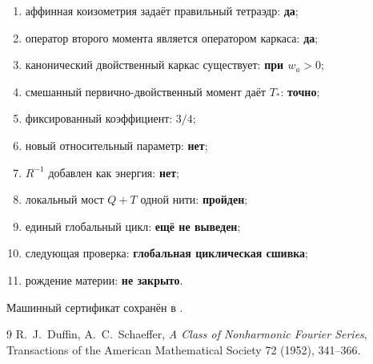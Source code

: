 \begin{protocol}
\begin{enumerate}
 \item аффинная коизометрия задаёт правильный тетраэдр: \textbf{да};
 \item оператор второго момента является оператором каркаса: \textbf{да};
 \item канонический двойственный каркас существует: \textbf{при $w_a>0$};
 \item смешанный первично-двойственный момент даёт $T_*$: \textbf{точно};
 \item фиксированный коэффициент: \textbf{$3/4$};
 \item новый относительный параметр: \textbf{нет};
 \item $R^{-1}$ добавлен как энергия: \textbf{нет};
 \item локальный мост $Q+T$ одной нити: \textbf{пройден};
 \item единый глобальный цикл: \textbf{ещё не выведен};
 \item следующая проверка: \textbf{глобальная циклическая сшивка};
 \item рождение материи: \textbf{не закрыто}.
\end{enumerate}
\end{protocol}

Машинный сертификат сохранён в
.

\begin{thebibliography}{9}
R.~J.~Duffin, A.~C.~Schaeffer,
\emph{A Class of Nonharmonic Fourier Series},
Transactions of the American Mathematical Society 72 (1952), 341--366.
\end{thebibliography}